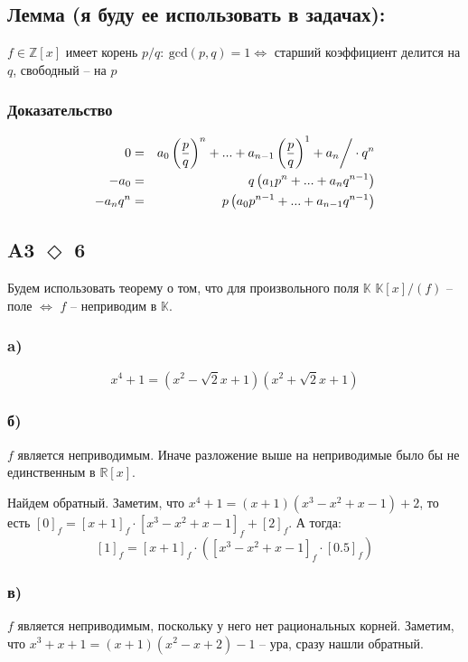 \documentclass[a4paper]{article}
\newcommand{\task}[2]{A#1 $\Diamond$ #2}
\begin{document}
  \subsection*{Лемма (я буду ее использовать в задачах):}
  $f \in \mathbb{Z}\left[x\right]$ имеет корень $p/q:\ \mathrm{gcd}(p, q) = 1 \Longleftrightarrow$ старший коэффициент делится на $q$, свободный -- на $p$
  \subsubsection*{Доказательство}
  \begin{eqnarray*}
    0 &=& a_0 \left(\frac{p}{q}\right)^n + ...+ a_{n - 1} \left(\frac{p}{q}\right)^1 + a_n \bigg{/} \cdot q^n \\
    -a_0 &=& q \left(a_1 p^n + ... + a_n q^{n - 1}\right) \\
    -a_n q^n &=& p \left(a_0 p^{n - 1} + ... + a_{n - 1} q^{n - 1}\right)
  \end{eqnarray*}

  \subsection*{\task{3}{6}}
  Будем использовать теорему о том, что для произвольного поля $\mathbb{K}$ $\mathbb{K} \left[x\right] / (f)$ -- поле $\Longleftrightarrow$ $f$ -- неприводим в $\mathbb{K}$.

  \subsubsection*{a)}
  $$x^4 + 1 = (x^2 - \sqrt{2}x + 1)(x^2 + \sqrt{2}x + 1)$$
  \subsubsection*{б)}
  $f$ является неприводимым. Иначе разложение выше на неприводимые было бы не единственным в $\mathbb{R}\left[x\right]$.

  Найдем обратный. Заметим, что $x^4 + 1 = (x + 1)(x^3 - x^2 + x - 1) + 2$, то есть $\left[0\right]_f = \left[x + 1\right]_f \cdot \left[x^3 - x^2 + x - 1\right]_f + \left[2\right]_f$. А тогда:
  $$\left[1\right]_f = \left[x + 1\right]_f \cdot \left(\left[x^3 - x^2 + x - 1\right]_f \cdot \left[0.5\right]_f\right) $$
  \subsubsection*{в)}
  $f$ является неприводимым, поскольку у него нет рациональных корней. Заметим, что $x^3+x+1=(x+1)(x^2-x+2)-1$ -- ура, сразу нашли обратный.
\end{document}
